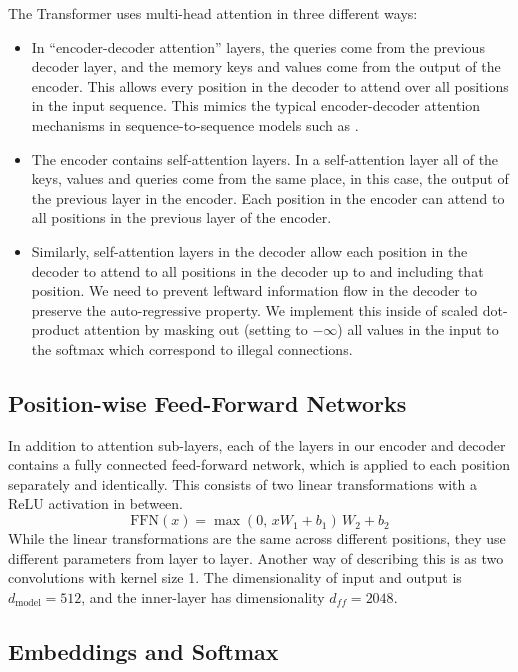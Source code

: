 The Transformer uses multi-head attention in three different ways:

\begin{itemize}
  \item In ``encoder-decoder attention'' layers, the queries come from the
    previous decoder layer, and the memory keys and values come from the output
    of the encoder. This allows every position in the decoder to attend over all
    positions in the input sequence. This mimics the typical encoder-decoder
    attention mechanisms in sequence-to-sequence models such as
    \cite{wu2016google,bahdanau2014neural,decomposableattentionmodel}.
  \item The encoder contains self-attention layers. In a self-attention layer
    all of the keys, values and queries come from the same place, in this case,
    the output of the previous layer in the encoder. Each position in the
    encoder can attend to all positions in the previous layer of the encoder.
  \item Similarly, self-attention layers in the decoder allow each position in
    the decoder to attend to all positions in the decoder up to and including
    that position. We need to prevent leftward information flow in the decoder
    to preserve the auto-regressive property. We implement this inside of
    scaled dot-product attention by masking out (setting to $-\infty$) all
    values in the input to the softmax which correspond to illegal connections.
\end{itemize}

\subsection{Position-wise Feed-Forward Networks}

In addition to attention sub-layers, each of the layers in our encoder and
decoder contains a fully connected feed-forward network, which is applied to
each position separately and identically. This consists of two linear
transformations with a ReLU activation in between.
\[
  \mathrm{FFN}(x) = \max(0,\, xW_1 + b_1)\,W_2 + b_2
\]
While the linear transformations are the same across different positions, they
use different parameters from layer to layer. Another way of describing this is
as two convolutions with kernel size 1. The dimensionality of input and output
is $d_{\text{model}} = 512$, and the inner-layer has dimensionality
$d_{ff} = 2048$.

\subsection{Embeddings and Softmax}

